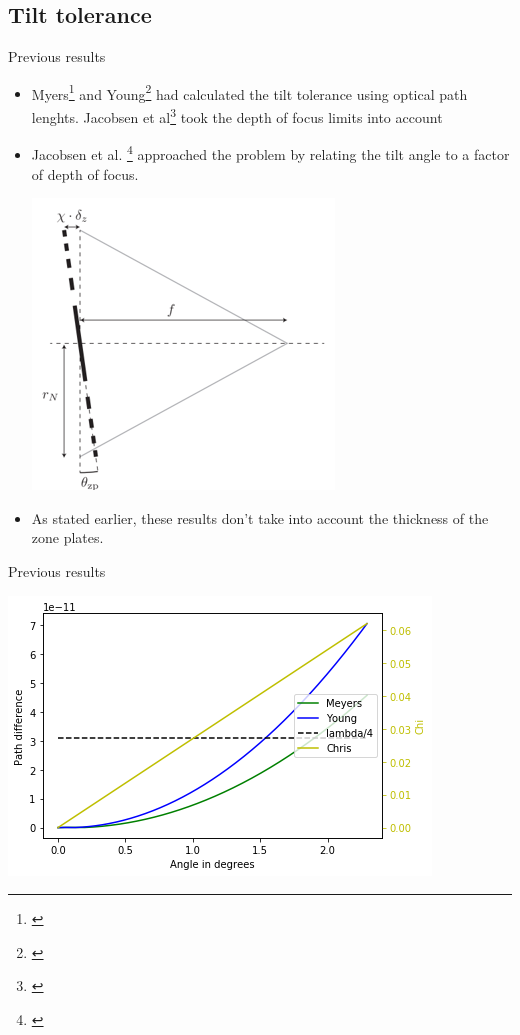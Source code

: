 \documentclass{beamer}
\begin{document}
\subsection{Tilt tolerance}
\begin{frame}{Previous results}
\begin{itemize}
	\item Myers\footnote{\cite{Myers1951}} and Young\footnote{\cite{Young1972}} had calculated the tilt tolerance using optical path lenghts. Jacobsen et al\footnote{\cite{Jacobsen1991}} took the depth of focus limits into account
	\item Jacobsen et al. \footnote{\cite{Chris_book}} approached the problem by relating the tilt angle to a factor of depth of focus. 
	\begin{center}
		\includegraphics[scale=0.3]{chi_zp}
	\end{center}
	\item As stated earlier, these results don't take into account the thickness of the zone plates.
\end{itemize}
\end{frame}

\begin{frame}{Previous results}
	  \begin{center}
	\includegraphics[scale=0.65]{lit_survey}
\end{center}
\end{frame}
\end{document}
